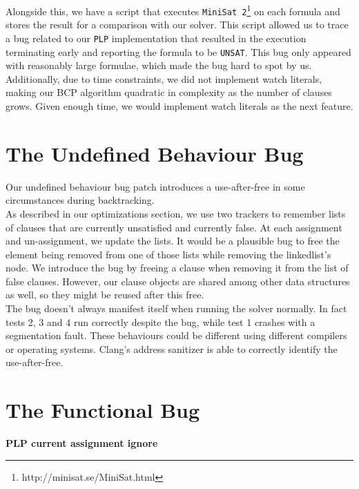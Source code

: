 \documentclass[a4paper]{article}
\begin{document}
Alongside this, we have a script that executes \texttt{MiniSat 2}\footnote{http://minisat.se/MiniSat.html} on each formula and stores the result for a comparison with our solver. This script allowed us to trace a bug related to our \texttt{PLP} implementation that resulted in the execution terminating early and reporting the formula to be \texttt{UNSAT}. This bug only appeared with reasonably large formulae, which made the bug hard to spot by us.
Additionally, due to time constraints, we did not implement watch literals, making our BCP algorithm quadratic in complexity as the number of clauses grows. Given enough time, we would implement watch literals as the next feature.


\section{The Undefined Behaviour Bug}

Our undefined behaviour bug patch introduces a use-after-free in some circumstances during backtracking.\\

As described in our optimizations section, we use two trackers to remember lists of clauses that are currently unsatisfied and currently false. At each assignment and un-assignment, we update the lists. It would be a plausible bug to free the element being removed from one of those lists while removing the linkedlist's node. We introduce the bug by freeing a clause when removing it from the list of false clauses. However, our clause objects are shared among other data structures as well, so they might be reused after this free. \\

The bug doesn't always manifest itself when running the solver normally. In fact tests 2, 3 and 4 run correctly despite the bug, while test 1 crashes with a segmentation fault. These behaviours could be different using different compilers or operating systems. Clang's address sanitizer is able to correctly identify the use-after-free.

\section{The Functional Bug}


\textbf{PLP current assignment ignore} \\
\end{document}
